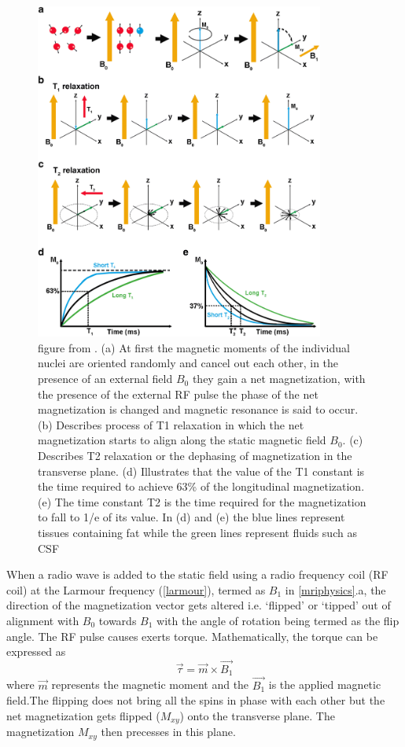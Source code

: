 \documentclass[msthesis.tex]{subfiles}
\begin{document}
\begin{figure}
\includegraphics[width=0.847\textwidth]{images/mri1.png}
\caption{figure from \cite{Mastrogiacomo2019}. (a) At first the magnetic moments of the individual nuclei are oriented randomly and cancel out each other, in the presence of an external field $B_0$ they gain a net magnetization, with the presence of the external RF pulse the phase of the net magnetization is changed and magnetic resonance is said to occur. (b) Describes process of T1 relaxation in which the net magnetization starts to align along the static magnetic field $B_0$. (c) Describes T2 relaxation or the dephasing of magnetization in the transverse plane. (d) Illustrates that the value of the T1 constant is the time required to achieve 63\% of the longitudinal magnetization. (e) The time constant T2 is the time required for the magnetization to fall to 1/e of its value. In (d) and (e) the blue lines represent tissues containing fat while the green lines represent fluids such as \gls{CSF}}
\label{mriphysics}
\end{figure}

When a radio wave is added to the static field using a radio frequency coil (RF coil) at the Larmour frequency (\autoref{larmour}), termed as $B_1$ in \autoref{mriphysics}.a, the direction of the magnetization vector gets altered i.e. ‘flipped’ or ‘tipped’ out of alignment with $B_0$ towards $B_1$ with the angle of rotation being termed as the flip angle. The RF pulse causes exerts torque. Mathematically, the torque can be expressed as
\begin{equation}
    \Vec{\tau} = \Vec{m} \times \Vec{B_1}
\end{equation}
where $\Vec{m}$ represents the magnetic moment and the $ \Vec{B_1}$ is the applied magnetic field.The flipping does not bring all the spins in phase with each other but the net magnetization gets flipped ($M_{xy}$) onto the transverse plane. The magnetization $M_{xy}$ then precesses in this plane.
\end{document}
